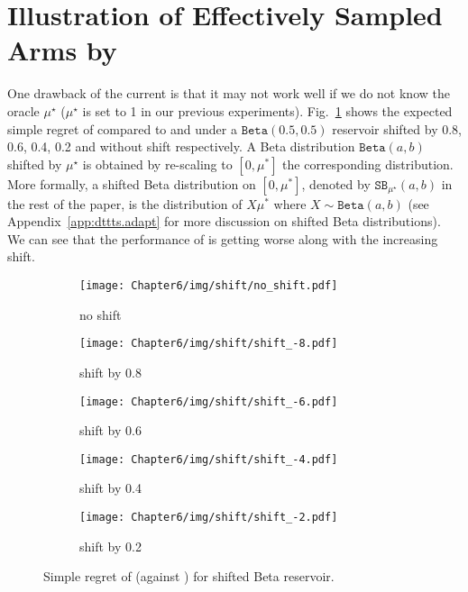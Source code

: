 \section{Illustration of Effectively Sampled Arms by \texorpdfstring{\DTTTS}{}}\label{app:dttts.arms}

One drawback of the current \DTTTS is that it may not work well if we do not know the oracle $\mu^\star$ ($\mu^\star$ is set to 1 in our previous experiments). Fig.~\ref{fig:shift} shows the expected simple regret of \DTTTS compared to \ISHA and \TTTS under a $\texttt{Beta}(0.5,0.5)$ reservoir shifted by 0.8, 0.6, 0.4, 0.2 and without shift respectively. A Beta distribution $\texttt{Beta}(a,b)$ shifted by $\mu^\star$ is obtained by re-scaling to $[0,\mu^*]$ the corresponding distribution. More formally, a shifted Beta distribution on $[0,\mu^*]$, denoted by  $\texttt{SB}_{\mu^\star}(a,b)$ in the rest of the paper, is the distribution of $X\mu^*$ where $X \sim \texttt{Beta}(a,b)$ (see Appendix~\ref{app:dttts.adapt} for more discussion on shifted Beta distributions). We can see that the performance of \DTTTS is getting worse along with the increasing shift.

\begin{figure}[ht]
  \centering
  \begin{subfigure}[t]{0.25\textwidth}
    \centering\texttt{[image: Chapter6/img/shift/no\_shift.pdf]}
    \caption{no shift}
  \end{subfigure}%
  \begin{subfigure}[t]{0.25\textwidth}
    \centering\texttt{[image: Chapter6/img/shift/shift\_-8.pdf]}
    \caption{shift by 0.8}
  \end{subfigure}
    \begin{subfigure}[t]{0.25\textwidth}
    \centering\texttt{[image: Chapter6/img/shift/shift\_-6.pdf]}
    \caption{shift by 0.6}
  \end{subfigure}%
  \begin{subfigure}[t]{0.25\textwidth}
    \centering\texttt{[image: Chapter6/img/shift/shift\_-4.pdf]}
    \caption{shift by 0.4}
  \end{subfigure}
  \begin{subfigure}[t]{0.25\textwidth}
    \centering\texttt{[image: Chapter6/img/shift/shift\_-2.pdf]}
    \caption{shift by 0.2}
  \end{subfigure}%
  \caption{Simple regret of \DTTTS (against \Hyperband) for shifted Beta reservoir.}
  \label{fig:shift}
\end{figure}

